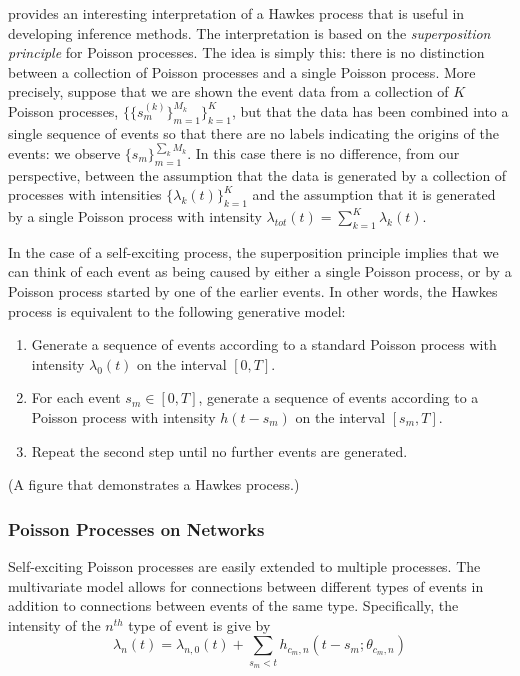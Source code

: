 \cite{} provides an interesting interpretation of a Hawkes process that is useful in developing inference methods. The interpretation is based on the \textit{superposition principle} for Poisson processes. The idea is simply this: there is no distinction between a collection of Poisson processes and a single Poisson process. More precisely, suppose that we are shown the event data from a collection of $K$ Poisson processes, $\{ \{ s_m^{(k)} \}_{m=1}^{M_k} \}_{k=1}^K$, but that the data has been combined into a single sequence of events so that there are no labels indicating the origins of the events: we observe $\{ s_m \}_{m=1}^{\sum_k M_k}$. In this case there is no difference, from our perspective, between the assumption that the data is generated by a collection of processes with intensities $\{\lambda_k(t)\}_{k=1}^K$ and the assumption that it is generated by a single Poisson process with intensity $\lambda_{tot}(t) = \sum_{k=1}^K \lambda_k(t)$.

In the case of a self-exciting process, the superposition principle implies that we can think of each event as being caused by either a single Poisson process, or by a Poisson process started by one of the earlier events. In other words, the Hawkes process is equivalent to the following generative model:
\begin{enumerate}
	\item Generate a sequence of events according to a standard Poisson process with intensity $\lambda_0(t)$ on the interval $[0,T]$.
	\item For each event $s_m \in [0, T]$, generate a sequence of events according to a Poisson process with intensity $h(t - s_m)$ on the interval $[s_m, T]$.
	\item Repeat the second step until no further events are generated.
\end{enumerate}

(A figure that demonstrates a Hawkes process.)

\subsubsection{Poisson Processes on Networks}
Self-exciting Poisson processes are easily extended to multiple processes. The multivariate model allows for connections between different types of events in addition to connections between events of the same type. Specifically, the intensity of the $n^{th}$ type of event is give by
\begin{equation} \label{eq:hawkes-intensity}
	\lambda_{n}(t) = \lambda_{n, 0}(t) + \sum_{s_m < t} h_{c_m, n}(t - s_m; \theta_{c_m, n})
\end{equation}

